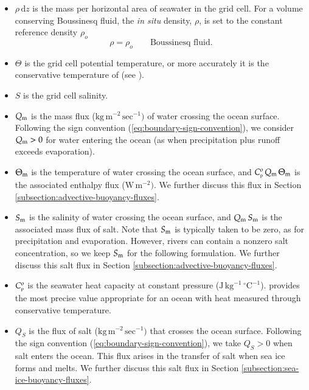 \begin{itemize}

\item $\rho \, \mathrm{d}z$ is the mass per horizontal area of
  seawater in the grid cell.  For a volume conserving Boussinesq
  fluid, the {\it in situ} density, $\rho$, is set to the constant
  reference density $\rho_{o}$
\begin{equation}
  \rho = \rho_{o}  \qquad \mbox{Boussinesq fluid.}
\end{equation}

\item $\Theta$ is the grid cell potential temperature, or more
  accurately it is the conservative temperature of
  \cite{McDougall2003} (see \cite{TEOS2010}).  

 \item $S$ is the grid cell salinity.

 \item $Q_{\mbox{\scriptsize m}}$ is the mass flux ($\mbox{kg} \, \mbox{m}^{-2} \,
   \mbox{sec}^{-1})$ of water crossing the ocean surface.  Following
   the sign convention (\ref{eq:boundary-sign-convention}), we
   consider $Q_{\mbox{\scriptsize m}} > 0$ for water entering the ocean (as when
   precipitation plus runoff exceeds evaporation).

 \item $\Theta_{\mbox{\scriptsize m}}$ is the temperature of water crossing the ocean
   surface, and $C_{\mbox{\tiny p}}^{o} \, Q_{\mbox{\scriptsize m}} \, \Theta_{\mbox{\scriptsize m}}$ is the
   associated enthalpy flux ($\mbox{W} \, \mbox{m}^{-2})$.  We further
   discuss this flux in Section
   \ref{subsection:advective-buoyancy-fluxes}.

 \item $S_{\mbox{\scriptsize m}}$ is the salinity of water crossing the ocean surface, and
   $Q_{\mbox{\scriptsize m}} \, S_{\mbox{\scriptsize m}}$ is the associated mass flux of salt.  Note that $S_{\mbox{\scriptsize m}}$
   is typically taken to be zero, as for precipitation and
   evaporation.  However, rivers can contain a nonzero salt
   concentration, so we keep $S_{\mbox{\scriptsize m}}$ for the following formulation.  We
   further discuss this salt flux in Section
   \ref{subsection:advective-buoyancy-fluxes}.

\item \label{heat_capacity} $C_{\mbox{\tiny p}}^{o}$ is the seawater heat capacity at
  constant pressure ($\mbox{J} \, \mbox{kg}^{-1} \,
  \mbox{}^{\circ}\mbox{C}^{-1}$).  \cite{TEOS2010} provides the most
  precise value appropriate for an ocean with heat measured through
  conservative temperature.

\item $Q_{S}$ is the flux of salt ($\mbox{kg} \, \mbox{m}^{-2} \,
  \mbox{sec}^{-1})$ that crosses the ocean surface.  Following the
  sign convention (\ref{eq:boundary-sign-convention}), we take $Q_{S}
  > 0$ when salt enters the ocean.  This flux arises in the transfer
  of salt when sea ice forms and melts.  We further discuss this salt
  flux in Section \ref{subsection:sea-ice-buoyancy-fluxes}.


\end{itemize}
